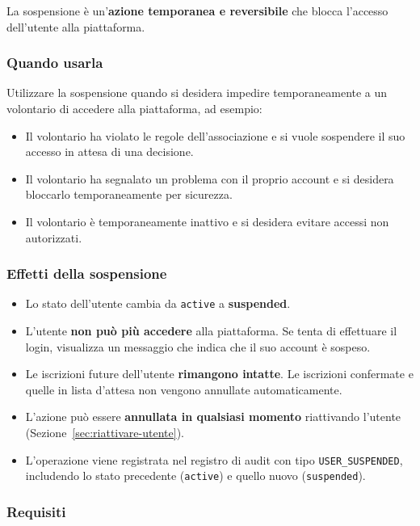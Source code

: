 \documentclass[a4paper,11pt,oneside]{book}
\begin{document}
La sospensione \`e un'\textbf{azione temporanea e reversibile} che blocca l'accesso dell'utente alla piattaforma.

\subsubsection{Quando usarla}

Utilizzare la sospensione quando si desidera impedire temporaneamente a un volontario di accedere alla piattaforma, ad esempio:

\begin{itemize}[leftmargin=1.5em]
  \item Il volontario ha violato le regole dell'associazione e si vuole sospendere il suo accesso in attesa di una decisione.
  \item Il volontario ha segnalato un problema con il proprio account e si desidera bloccarlo temporaneamente per sicurezza.
  \item Il volontario \`e temporaneamente inattivo e si desidera evitare accessi non autorizzati.
\end{itemize}

\subsubsection{Effetti della sospensione}

\begin{itemize}[leftmargin=1.5em]
  \item Lo stato dell'utente cambia da \texttt{active} a \textbf{suspended}.
  \item L'utente \textbf{non pu\`o pi\`u accedere} alla piattaforma. Se tenta di effettuare il login, visualizza un messaggio che indica che il suo account \`e sospeso.
  \item Le iscrizioni future dell'utente \textbf{rimangono intatte}. Le iscrizioni confermate e quelle in lista d'attesa non vengono annullate automaticamente.
  \item L'azione pu\`o essere \textbf{annullata in qualsiasi momento} riattivando l'utente (Sezione~\ref{sec:riattivare-utente}).
  \item L'operazione viene registrata nel registro di audit con tipo \texttt{USER\_SUSPENDED}, includendo lo stato precedente (\texttt{active}) e quello nuovo (\texttt{suspended}).
\end{itemize}

\subsubsection{Requisiti}
\end{document}
